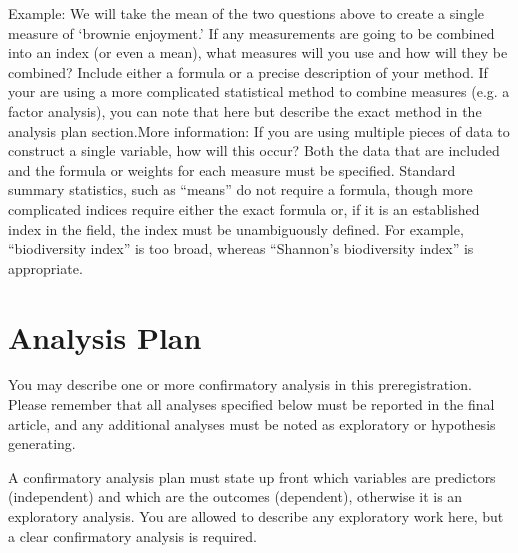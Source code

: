 \documentclass[highlight, explanations]{prereg}
\begin{document}
{Example: We will take the mean of the two questions above to create a single measure of ‘brownie enjoyment.’ 
}
{If any measurements are  going to be combined into an index (or even a mean), what measures will you use and how will they be combined? Include either a formula or a precise description of your method. If your are using a more complicated statistical method to combine measures (e.g. a factor analysis), you can note that here but describe the exact method in the analysis plan section.More information: If you are using multiple pieces of data to construct a single variable, how will this occur? Both the data that are included and the formula or weights for each measure must be specified. Standard summary statistics, such as “means” do not require a formula, though more complicated indices require either the exact formula or, if it is an established index in the field, the index must be unambiguously defined. For example, “biodiversity index” is too broad, whereas “Shannon’s biodiversity index” is appropriate.
}

\section{Analysis Plan}

You may describe one or more confirmatory analysis in this preregistration. Please remember that all analyses specified below must be reported in the final article, and any additional analyses must be noted as exploratory or hypothesis generating.

A confirmatory analysis plan must state up front which variables are predictors (independent) and which are the outcomes (dependent), otherwise it is an exploratory analysis. You are allowed to describe any exploratory work here, but a clear confirmatory analysis is required. 
\end{document}

